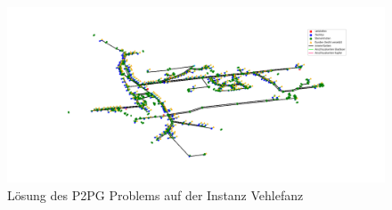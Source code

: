 \documentclass[11pt,a4paper]{article}
\theoremstyle{my_th_style1}
\begin{document}
\begin{figure}
\begin{center}
	\begin{minipage}{12.0cm}
		\includegraphics[width=1\textwidth]{./Bilder/P2PG_Vehlefanz}
		\caption{Lösung des P2PG Problems auf der Instanz Vehlefanz}
	\end{minipage}
\end{center}
\end{figure}

\thispagestyle{empty}
\end{document}
